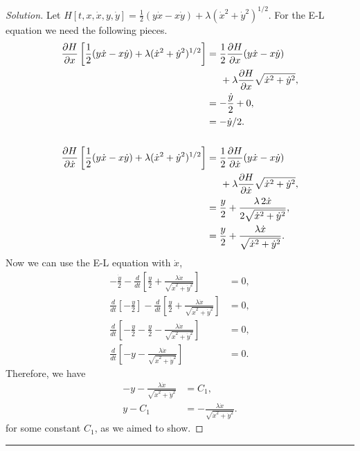 \documentclass[letterpaper, 12pt]{amsart}
\theoremstyle{definition}  							%
\begin{document}
		\begin{proof}[Solution]
		Let $H[t, x, \dot{x}, y, \dot{y}] = \tfrac{1}{2}(y\dot{x} - x\dot{y})+\lambda(\dot{x}^{2} + \dot{y}^{2})^{1/2}$.
		For the E-L equation we need the following pieces.
			\begin{align*}
				\frac{\partial H}{\partial x}\left[ \frac{1}{2}(y\dot{x} - x\dot{y})+\lambda(\dot{x}^{2} + \dot{y}^{2})^{1/2} \right] &= \frac{1}{2} \frac{\partial H}{\partial x} (y\dot{x} - x\dot{y}) \\
				&\hspace{5mm} + \lambda \frac{\partial H}{\partial x}\sqrt{\dot{x}^{2} + \dot{y}^{2}}, \\
				&= -\frac{\dot{y}}{2} + 0, \\
				&= -\dot{y}/2. \\
				\\
				\frac{\partial H}{\partial \dot{x}}\left[ \frac{1}{2}(y\dot{x} - x\dot{y})+\lambda(\dot{x}^{2} + \dot{y}^{2})^{1/2} \right] &= \frac{1}{2} \frac{\partial H}{\partial \dot{x}} (y\dot{x} - x\dot{y}) \\
				&\hspace{5mm} + \lambda \frac{\partial H}{\partial \dot{x}}\sqrt{\dot{x}^{2} + \dot{y}^{2}}, \\
				&= \frac{y}{2} + \frac{\lambda \, 2\dot{x}}{2 \sqrt{\dot{x}^{2} + \dot{y}^{2}}}, \\
				&= \frac{y}{2} + \frac{\lambda \dot{x}}{\sqrt{\dot{x}^{2} + \dot{y}^{2}}}.
			\end{align*}
		Now we can use the E-L equation with $\dot{x}$,
			\begin{align*}
				- \frac{\dot{y}}{2} - \frac{d}{dt}\left[ \frac{y}{2} + \frac{\lambda \dot{x}}{\sqrt{\dot{x}^{2} + \dot{y}^{2}}} \right] &= 0, \\
				\frac{d}{dt}\left[ -\frac{y}{2} \right] - \frac{d}{dt}\left[ \frac{y}{2} + \frac{\lambda \dot{x}}{\sqrt{\dot{x}^{2} + \dot{y}^{2}}} \right] &= 0, \\
				\frac{d}{dt}\left[ -\frac{y}{2} - \frac{y}{2} - \frac{\lambda \dot{x}}{\sqrt{\dot{x}^{2} + \dot{y}^{2}}} \right] &= 0, \\
				\frac{d}{dt}\left[ -y - \frac{\lambda \dot{x}}{\sqrt{\dot{x}^{2} + \dot{y}^{2}}} \right] &= 0.
			\end{align*}
		Therefore, we have 
			\begin{align*}
				-y - \frac{\lambda \dot{x}}{\sqrt{\dot{x}^{2} + \dot{y}^{2}}} &= C_{1}, \\
				y - C_{1} &= - \frac{\lambda \dot{x}}{\sqrt{\dot{x}^{2} + \dot{y}^{2}}}.
			\end{align*}
		for some constant $C_{1}$, as we aimed to show.			
		\end{proof}
		\vspace*{2mm}
		\hrule
		\vspace*{2mm}
\end{document}
